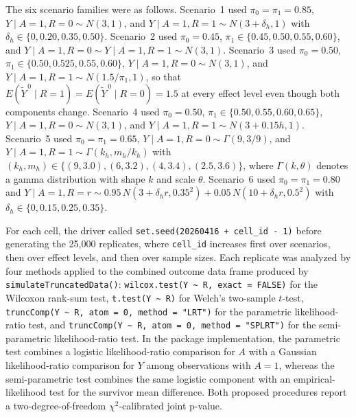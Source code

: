 \documentclass[11pt]{article}
\begin{document}
The six scenario families were as follows. Scenario~1 used $\pi_0 = \pi_1 = 0.85$, $Y \mid A = 1, R = 0 \sim N(3, 1)$, and $Y \mid A = 1, R = 1 \sim N(3 + \delta_h, 1)$ with $\delta_h \in \{0, 0.20, 0.35, 0.50\}$. Scenario~2 used $\pi_0 = 0.45$, $\pi_1 \in \{0.45, 0.50, 0.55, 0.60\}$, and $Y \mid A = 1, R = 0 \sim Y \mid A = 1, R = 1 \sim N(3, 1)$. Scenario~3 used $\pi_0 = 0.50$, $\pi_1 \in \{0.50, 0.525, 0.55, 0.60\}$, $Y \mid A = 1, R = 0 \sim N(3, 1)$, and $Y \mid A = 1, R = 1 \sim N(1.5/\pi_1, 1)$, so that $E(\widetilde{Y}^{\,0} \mid R = 1) = E(\widetilde{Y}^{\,0} \mid R = 0) = 1.5$ at every effect level even though both components change. Scenario~4 used $\pi_0 = 0.50$, $\pi_1 \in \{0.50, 0.55, 0.60, 0.65\}$, $Y \mid A = 1, R = 0 \sim N(3, 1)$, and $Y \mid A = 1, R = 1 \sim N(3 + 0.15h, 1)$. Scenario~5 used $\pi_0 = \pi_1 = 0.65$, $Y \mid A = 1, R = 0 \sim \Gamma(9, 3/9)$, and $Y \mid A = 1, R = 1 \sim \Gamma(k_h, m_h/k_h)$ with $(k_h, m_h) \in \{(9, 3.0), (6, 3.2), (4, 3.4), (2.5, 3.6)\}$, where $\Gamma(k,\theta)$ denotes a gamma distribution with shape $k$ and scale $\theta$. Scenario~6 used $\pi_0 = \pi_1 = 0.80$ and $Y \mid A = 1, R = r \sim 0.95\,N(3 + \delta_h r, 0.35^2) + 0.05\,N(10 + \delta_h r, 0.5^2)$ with $\delta_h \in \{0, 0.15, 0.25, 0.35\}$.

For each cell, the driver called \texttt{set.seed(20260416 + cell\_id - 1)} before generating the 25,000 replicates, where \texttt{cell\_id} increases first over scenarios, then over effect levels, and then over sample sizes. Each replicate was analyzed by four methods applied to the combined outcome data frame produced by \texttt{simulateTruncatedData()}: \texttt{wilcox.test(Y \textasciitilde{} R, exact = FALSE)} for the Wilcoxon rank-sum test, \texttt{t.test(Y \textasciitilde{} R)} for Welch's two-sample $t$-test, \texttt{truncComp(Y \textasciitilde{} R, atom = 0, method = "LRT")} for the parametric likelihood-ratio test, and \texttt{truncComp(Y \textasciitilde{} R, atom = 0, method = "SPLRT")} for the semi-parametric likelihood-ratio test. In the package implementation, the parametric test combines a logistic likelihood-ratio comparison for $A$ with a Gaussian likelihood-ratio comparison for $Y$ among observations with $A = 1$, whereas the semi-parametric test combines the same logistic component with an empirical-likelihood test for the survivor mean difference. Both proposed procedures report a two-degree-of-freedom $\chi^2$-calibrated joint p-value.
\end{document}
